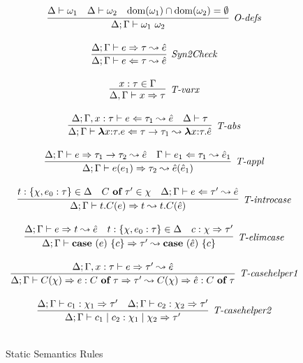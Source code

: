 \begin{figure}
\[\begin{array}{c}
\infer[\textit{O-defs}]
	{\Delta; \Gamma \vdash \omega_1\ \omega_2  }
	{\Delta \vdash \omega_1 & \Delta \vdash \omega_2 & \text{dom}(\omega_1) \intersect \text{dom}(\omega_2) = \emptyset } \\[3ex]

\infer[\textit{Syn2Check}]
	{\Delta; \Gamma \vdash  e \Leftarrow \tau \leadsto \hat{e}} 
	{\Delta;\Gamma \vdash e \Rightarrow \tau \leadsto \hat{e}   }\\[3ex]
	
\infer[\textit{T-varx}]
	{\Delta,\Gamma \vdash x\Rightarrow\tau } 
	{x:\tau \in \Gamma }\\[3ex]

\infer[\textit{T-abs}]
	{\Delta; \Gamma \vdash  \boldsymbol\lambda x{:}\tau . e \Leftarrow \tau \rightarrow \tau_1 \leadsto \boldsymbol\lambda x{:}\tau .\hat{e}} 
	{\Delta; \Gamma, x:\tau \vdash e\Leftarrow \tau_1 \leadsto \hat{e}  & \Delta\vdash \tau}\\[3ex]

\infer[\textit{T-appl}]
	{\Delta; \Gamma \vdash  e(e_1) \Rightarrow \tau_2  \leadsto \hat{e}(\hat{e}_1) } 
	{\Delta; \Gamma \vdash e \Rightarrow \tau_1 \rightarrow \tau_2  \leadsto \hat{e}  & \Gamma \vdash e_1 \Leftarrow \tau_1 \leadsto \hat{e}_1 }\\[3ex]

\infer[\textit{T-introcase}]
	{\Delta; \Gamma \vdash  t.C(e) \Rightarrow t  \leadsto t.C(\hat{e}) } 
	{t:\{\chi, e_0:\tau\} \in \Delta & C\ \keyw{of}\ \tau' \in \chi &\Delta; \Gamma \vdash e \Leftarrow \tau'  \leadsto \hat{e}}\\[3ex]

\infer[\textit{T-elimcase}]
	{\Delta; \Gamma \vdash  \keyw{case}~(e)~\{ c \} \Rightarrow \tau'  \leadsto \keyw{case}~(\hat{e})~\{ c \} } 
	{\Delta; \Gamma \vdash e \Rightarrow t  \leadsto \hat{e}  & t:\{ \chi,e_0:\tau\} \in \Delta & c:\chi \Rightarrow \tau'}\\[3ex]

\infer[\textit{T-casehelper1}]
	{\Delta; \Gamma \vdash  C(\chi)\Rightarrow e : C\ \keyw{of}\ \tau \Rightarrow \tau' \leadsto C(\chi)\Rightarrow \hat{e} : C\ \keyw{of}\ \tau} 
	{\Delta; \Gamma, x:\tau \vdash e \Rightarrow \tau' \leadsto \hat{e}}\\[3ex]

\infer[\textit{T-casehelper2}]
	{\Delta; \Gamma \vdash  c_1 \bnfalt c_2: \chi_1 \bnfalt \chi_2 \Rightarrow \tau' } 
	{\Delta; \Gamma \vdash c_1:\chi_1 \Rightarrow \tau' & \Delta; \Gamma \vdash c_2:\chi_2 \Rightarrow \tau'}\\[3ex]


\end{array}
\]
\caption{Static Semantics Rules}
\end{figure}

